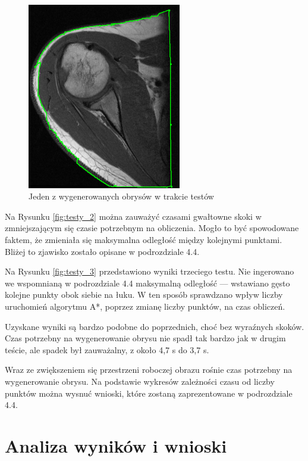 \documentclass[a4paper,11pt,twoside,openright]{report}
\theoremstyle{definition}
\begin{document}
\begin{figure}[h!]
	\center
	\includegraphics[width=0.6\textwidth]{108}
	\caption{Jeden z wygenerowanych obrysów w trakcie testów}
    	\label{fig:108}
\end{figure}


Na Rysunku \ref{fig:testy_2} można zauważyć czasami gwałtowne skoki w zmniejszającym
się czasie potrzebnym na obliczenia. Mogło to być spowodowane faktem, że zmieniała
się maksymalna odległość między kolejnymi punktami. Bliżej to zjawisko zostało
opisane w podrozdziale 4.4.

Na Rysunku \ref{fig:testy_3} przedstawiono wyniki trzeciego testu. Nie ingerowano
we wspomnianą w podrozdziale 4.4 maksymalną odległość --- wstawiano gęsto kolejne
punkty obok siebie na łuku. W ten sposób sprawdzano wpływ liczby uruchomień
algorytmu A*, poprzez zmianę liczby punktów, na czas obliczeń.

Uzyskane wyniki są bardzo podobne do poprzednich, choć bez wyraźnych skoków.
Czas potrzebny na wygenerowanie obrysu nie spadł tak bardzo jak w drugim teście,
ale spadek był zauważalny, z około 4,7 s do 3,7 s.

Wraz ze zwiększeniem się przestrzeni roboczej obrazu rośnie czas potrzebny na
wygenerowanie obrysu. Na podstawie wykresów zależności czasu od liczby punktów
można wysnuć wnioski, które zostaną zaprezentowane w podrozdziale 4.4.

\section {Analiza wyników i wnioski}
\end{document}
